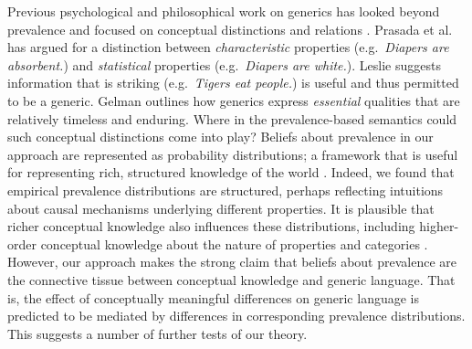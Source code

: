 \documentclass{pnastwo}
\begin{document}
\begin{article}
Previous psychological and philosophical work on generics has looked beyond prevalence and focused on conceptual distinctions and relations \cite{Gelman2005,Prasada2013,Leslie2007,Leslie2008}. 
Prasada et al. has argued for a distinction between \emph{characteristic} properties (e.g.~\emph{Diapers are absorbent.}) and \emph{statistical} properties (e.g.~\emph{Diapers are white.}).
Leslie suggests information that is striking (e.g.~\emph{Tigers eat people.}) is useful and thus permitted to be a generic.
Gelman outlines how generics express \emph{essential} qualities that are relatively timeless and enduring. %
Where in the prevalence-based semantics could such conceptual distinctions come into play?
Beliefs about prevalence in our approach are represented as probability distributions; a framework that is useful for representing rich, structured knowledge of the world \cite{Goodmanconcepts}. 
Indeed, we found that empirical prevalence distributions are structured, perhaps reflecting intuitions about causal mechanisms underlying different properties.
It is plausible that richer conceptual knowledge also influences these distributions, including higher-order conceptual knowledge about the nature of properties and categories \cite{Gelman2005,Keil1992}. 
However, our approach makes the strong claim that beliefs about prevalence are the connective tissue between conceptual knowledge and generic language.
That is, the effect of conceptually meaningful differences on generic language is predicted to be mediated by differences in corresponding prevalence distributions.
This suggests a number of further tests of our theory.




\end{article}
\end{document}
